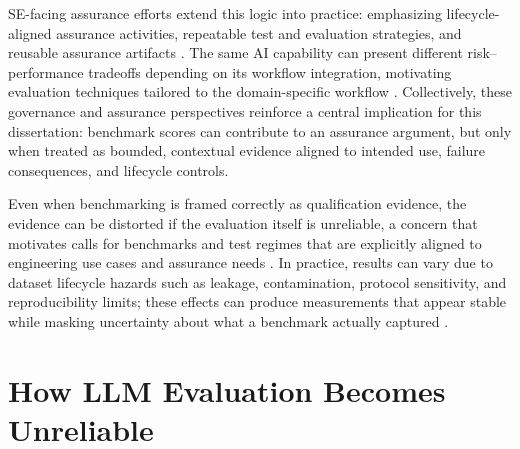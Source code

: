 SE-facing assurance efforts extend this logic into practice: emphasizing lifecycle-aligned assurance activities, repeatable test and evaluation strategies, and reusable assurance artifacts \cite{Johnson_Operationalizing_AI_Assurance_2025, Lanus_Tailorable_Risk_Informed_AI_Test_Evaluation_Strategy_2025, Charnetzki_Hazard_Analysis_RAG_LLM_Systems_2025}. The same AI capability can present different risk–performance tradeoffs depending on its workflow integration, motivating evaluation techniques tailored to the domain-specific workflow \cite{Szajnfarber_SERC_Perspective_AI4SE_SE4AI_2025, heckle2024responsible}. Collectively, these governance and assurance perspectives reinforce a central implication for this dissertation: benchmark scores can contribute to an assurance argument, but only when treated as bounded, contextual evidence aligned to intended use, failure consequences, and lifecycle controls.

Even when benchmarking is framed correctly as qualification evidence, the evidence can be distorted if the evaluation itself is unreliable, a concern that motivates calls for benchmarks and test regimes that are explicitly aligned to engineering use cases and assurance needs \cite{raz_ExplainableAICounterfactuals_2023}. In practice, results can vary due to dataset lifecycle hazards such as leakage, contamination, protocol sensitivity, and reproducibility limits; these effects can produce measurements that appear stable while masking uncertainty about what a benchmark actually captured 
\cite{Cheng_2024_Benchmark_Data_Contamination, magar_DataContaminationMemorizationExploitation_2022, weber_MindInstructionsHolisticEvaluation_2023}.



\section{How LLM Evaluation Becomes Unreliable}
\label{sec:ch2_eval_unreliable}



